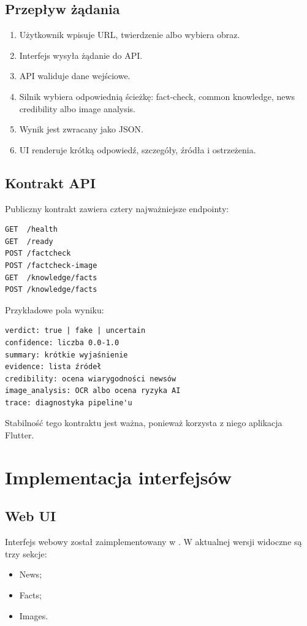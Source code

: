 \documentclass[12pt,a4paper]{article}
\begin{document}
\subsection{Przepływ żądania}
\begin{enumerate}
  \item Użytkownik wpisuje URL, twierdzenie albo wybiera obraz.
  \item Interfejs wysyła żądanie do API.
  \item API waliduje dane wejściowe.
  \item Silnik wybiera odpowiednią ścieżkę: fact-check, common knowledge, news credibility albo image analysis.
  \item Wynik jest zwracany jako JSON.
  \item UI renderuje krótką odpowiedź, szczegóły, źródła i ostrzeżenia.
\end{enumerate}

\subsection{Kontrakt API}
Publiczny kontrakt zawiera cztery najważniejsze endpointy:
\begin{verbatim}
GET  /health
GET  /ready
POST /factcheck
POST /factcheck-image
GET  /knowledge/facts
POST /knowledge/facts
\end{verbatim}

Przykładowe pola wyniku:
\begin{verbatim}
verdict: true | fake | uncertain
confidence: liczba 0.0-1.0
summary: krótkie wyjaśnienie
evidence: lista źródeł
credibility: ocena wiarygodności newsów
image_analysis: OCR albo ocena ryzyka AI
trace: diagnostyka pipeline'u
\end{verbatim}

Stabilność tego kontraktu jest ważna, ponieważ korzysta z niego aplikacja Flutter.

\section{Implementacja interfejsów}
\subsection{Web UI}
Interfejs webowy został zaimplementowany w .
W aktualnej wersji widoczne są trzy sekcje:
\begin{itemize}
  \item News;
  \item Facts;
  \item Images.
\end{itemize}
\end{document}
